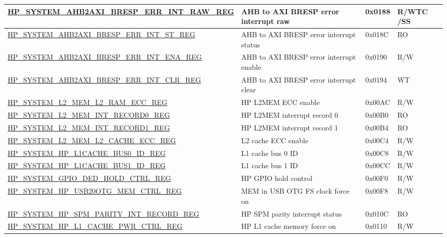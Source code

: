 \begin{longtable}{ | L{8.5cm} | L{6cm} | l | L{1.2cm} | }
\hyperref[regdesc:HPSYSTEMAHB2AXIBRESPERRINTRAWREG]{HP\_SYSTEM\_AHB2AXI\_BRESP\_ERR\_INT\_RAW\_REG} & AHB to AXI BRESP error interrupt raw & 0x0188 & R/WTC /SS \\ \hline
\hyperref[regdesc:HPSYSTEMAHB2AXIBRESPERRINTSTREG]{HP\_SYSTEM\_AHB2AXI\_BRESP\_ERR\_INT\_ST\_REG} & AHB to AXI BRESP error interrupt status & 0x018C & RO \\ \hline
\hyperref[regdesc:HPSYSTEMAHB2AXIBRESPERRINTENAREG]{HP\_SYSTEM\_AHB2AXI\_BRESP\_ERR\_INT\_ENA\_REG} & AHB to AXI BRESP error interrupt enable & 0x0190 & R/W \\ \hline
\hyperref[regdesc:HPSYSTEMAHB2AXIBRESPERRINTCLRREG]{HP\_SYSTEM\_AHB2AXI\_BRESP\_ERR\_INT\_CLR\_REG} & AHB to AXI BRESP error interrupt clear & 0x0194 & WT \\ \hline
\hyperref[regdesc:HPSYSTEML2MEML2RAMECCREG]{HP\_SYSTEM\_L2\_MEM\_L2\_RAM\_ECC\_REG} & HP L2MEM ECC enable & 0x00AC & R/W \\ \hline
\hyperref[regdesc:HPSYSTEML2MEMINTRECORD0REG]{HP\_SYSTEM\_L2\_MEM\_INT\_RECORD0\_REG} & HP L2MEM interrupt record 0 & 0x00B0 & RO \\ \hline
\hyperref[regdesc:HPSYSTEML2MEMINTRECORD1REG]{HP\_SYSTEM\_L2\_MEM\_INT\_RECORD1\_REG} & HP L2MEM interrupt record 1 & 0x00B4 & RO \\ \hline
\hyperref[regdesc:HPSYSTEML2MEML2CACHEECCREG]{HP\_SYSTEM\_L2\_MEM\_L2\_CACHE\_ECC\_REG} & L2 cache ECC enable & 0x00C4 & R/W \\ \hline
\hyperref[regdesc:HPSYSTEMHPL1CACHEBUS0IDREG]{HP\_SYSTEM\_HP\_L1CACHE\_BUS0\_ID\_REG} & L1 cache bus 0 ID & 0x00C8 & R/W \\ \hline
\hyperref[regdesc:HPSYSTEMHPL1CACHEBUS1IDREG]{HP\_SYSTEM\_HP\_L1CACHE\_BUS1\_ID\_REG} & L1 cache bus 1 ID & 0x00CC & R/W \\ \hline
\hyperref[regdesc:HPSYSTEMGPIODEDHOLDCTRLREG]{HP\_SYSTEM\_GPIO\_DED\_HOLD\_CTRL\_REG} & HP GPIO hold control & 0x00F0 & R/W \\ \hline
\hyperref[regdesc:HPSYSTEMHPUSB20OTGMEMCTRLREG]{HP\_SYSTEM\_HP\_USB20OTG\_MEM\_CTRL\_REG} & MEM in USB OTG FS clock force on & 0x00F8 & R/W \\ \hline
\hyperref[regdesc:HPSYSTEMHPSPMPARITYINTRECORDREG]{HP\_SYSTEM\_HP\_SPM\_PARITY\_INT\_RECORD\_REG} & HP SPM parity interrupt status & 0x010C & RO \\ \hline
\hyperref[regdesc:HPSYSTEMHPL1CACHEPWRCTRLREG]{HP\_SYSTEM\_HP\_L1\_CACHE\_PWR\_CTRL\_REG} & HP L1 cache memory force on & 0x0110 & R/W \\ \hline

\end{longtable}
